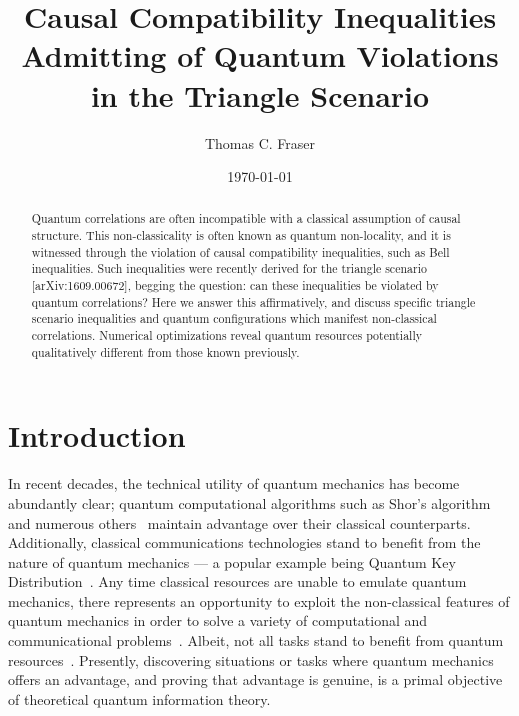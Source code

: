 \documentclass[aps, 10pt, english, twoside, pra, nofootinbib, tightenlines, longbibliography]{revtex4-1}
\begin{document}
    \title{Causal Compatibility Inequalities Admitting of Quantum Violations in the Triangle Scenario}
    \author{Thomas C. Fraser}
    \date{\today}
    \begin{abstract}
        Quantum correlations are often incompatible with a classical assumption of causal structure. This non-classicality is often known as quantum non-locality, and it is witnessed through the violation of causal compatibility inequalities, such as Bell inequalities. Such inequalities were recently derived for the triangle scenario [arXiv:1609.00672], begging the question: can these inequalities be violated by quantum correlations? Here we answer this affirmatively, and discuss specific triangle scenario inequalities and quantum configurations which manifest non-classical correlations. Numerical optimizations reveal quantum resources potentially qualitatively different from those known previously.
    \end{abstract}
    \maketitle
    \tableofcontents
    \setlength{\parskip}{1em}
    \clearpage

    \section{Introduction}
    \label{sec:introduction}
    In recent decades, the technical utility of quantum mechanics has become abundantly clear; quantum computational algorithms such as Shor's algorithm~\cite{Shor_1997} and numerous others~\cite{Jordan_2016} maintain advantage over their classical counterparts. Additionally, classical communications technologies stand to benefit from the nature of quantum mechanics --- a popular example being Quantum Key Distribution~\cite{Bennett_2014}. Any time classical resources are unable to emulate quantum mechanics, there represents an opportunity to exploit the non-classical features of quantum mechanics in order to solve a variety of computational and communicational problems~\cite{Neilsen_Chaung_2011}. Albeit, not all tasks stand to benefit from quantum resources~\cite{Almeida_2010}. Presently, discovering situations or tasks where quantum mechanics offers an advantage, and proving that advantage is genuine, is a primal objective of theoretical quantum information theory.
\end{document}

